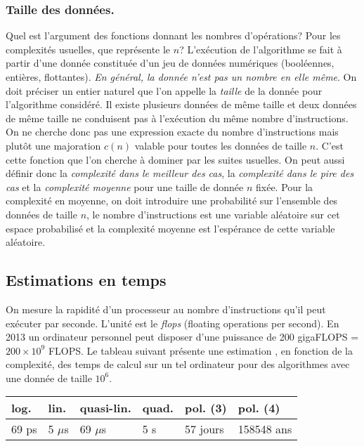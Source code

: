 \subsubsection{Taille des données.}
Quel est l'argument des fonctions donnant les nombres d'opérations? Pour les complexités usuelles, que représente le $n$?\newline
L'exécution de l'algorithme se fait à partir d'une donnée constituée d'un jeu de données numériques (booléennes, entières, flottantes). \emph{En général, la donnée n'est pas un nombre en elle même}.\newline
On doit préciser un entier naturel que l'on appelle la \emph{taille} de la donnée pour l'algorithme considéré. Il existe plusieurs données de même taille et deux données de même taille ne conduisent pas à l'exécution du même nombre d'instructions. On ne cherche donc pas une expression exacte du nombre d'instructions mais plutôt une majoration $c(n)$ valable pour toutes les données de taille $n$. C'est cette fonction que l'on cherche à dominer par les suites usuelles. \newline
On peut aussi définir donc la \emph{complexité dans le meilleur des cas},  la \emph{complexité dans le pire des cas} et la \emph{complexité moyenne} pour une taille de donnée $n$ fixée.\newline
Pour la complexité en moyenne, on doit introduire une probabilité sur l'ensemble des données de taille $n$, le nombre d'instructions est une variable aléatoire sur cet espace probabilisé et la complexité moyenne est l'espérance de cette variable aléatoire.

\subsection{Estimations en temps}
On mesure la rapidité d'un processeur au nombre d'instructions qu'il peut exécuter par seconde. L'unité est le \emph{flops} (floating operations per second).\newline
En 2013 un ordinateur personnel peut disposer d'une puissance de 200 gigaFLOPS = $200\times 10^{9}$ FLOPS. Le tableau suivant présente une estimation , en fonction de la complexité, des temps de calcul sur un tel ordinateur pour des algorithmes avec une donnée de taille $10^{6}$.
\begin{center}
\renewcommand{\arraystretch}{1.5}
\begin{tabular}{|l|l|l|l|l|l|} \hline
log. & lin. & quasi-lin. & quad. & pol. (3) & pol. (4)\\ \hline
69 ps & 5 $\mu$s & 69 $\mu$s & 5 s & 57 jours & 158548 ans \\ \hline
\end{tabular}
\end{center}


